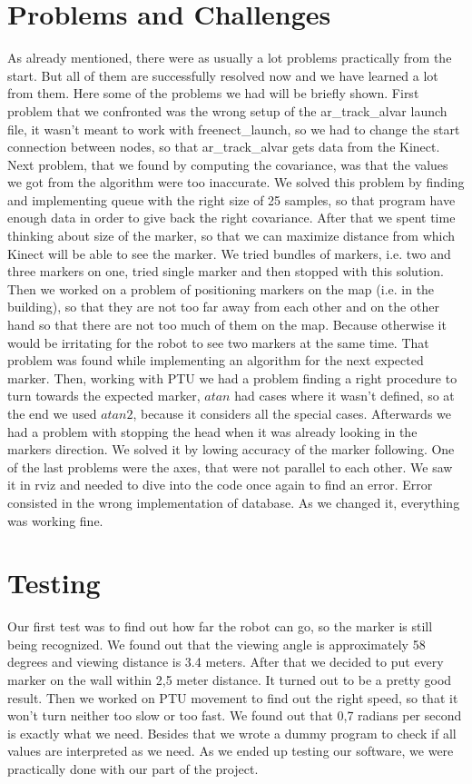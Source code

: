 \section{Problems and Challenges}

As already mentioned, there were as usually a lot problems practically from the start. But all of them are successfully resolved now and we have learned a lot from them. Here some of the problems we had will be briefly shown. First problem that we confronted was the wrong setup of the ar\_track\_alvar launch file, it wasn’t meant to work with freenect\_launch, so we had to change the start connection between nodes, so that ar\_track\_alvar gets data from the Kinect. Next problem, that we found by computing the covariance, was that the values we got from the algorithm were too inaccurate. We solved this problem by finding and implementing queue with the right size of 25 samples, so that program have enough data in order to give back the right covariance. After that we spent time thinking about size of the marker, so that we can maximize distance from which Kinect will be able to see the marker. We tried bundles of markers, i.e. two and three markers on one, tried single marker and then stopped with this solution. Then we worked on a problem of positioning markers on the map (i.e. in the building), so that they are not too far away from each other and on the other hand so that there are not too much of them on the map. Because otherwise it would be irritating for the robot to see two markers at the same time. That problem was found while implementing an algorithm for the next expected marker. Then, working with PTU we had a problem finding a right procedure to turn towards the expected marker, $atan$ had cases where it wasn't defined, so at the end we used $atan2$, because it considers all the special cases. Afterwards we had a problem with stopping the head when it was already looking in the markers direction. We solved it by lowing accuracy of the marker following. One of the last problems were the axes, that were not parallel to each other. We saw it in rviz and needed to dive into the code once again to find an error. Error consisted in the wrong implementation of database. As we changed it, everything was working fine. 

\section{Testing}

Our first test was to find out how far the robot can go, so the marker is still being recognized. We found out that the viewing angle is approximately 58 degrees and viewing distance is 3.4 meters.
 After that we decided to put every marker on the wall within 2,5 meter distance. It turned out to be a pretty good result. Then we worked on PTU movement to find out the right speed, so that it won’t turn neither too slow or too fast. We found out that 0,7 radians per second is exactly what we need. Besides that we wrote a dummy program to check if all values are interpreted as we need. As we ended up testing our software, we were practically done with our part of the project.

